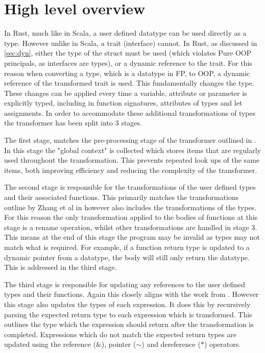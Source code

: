 \documentclass[ oneside,%
                    author={James Elgar},
                    degree={MEng},
                     title={Bidirectional transformer between functional and \\ object-oriented programming in Rust},
                  subtitle={}]{dissertation}
\newcommand{\weixin}{Zhang et al }
\begin{document}
\section{High level overview}

In Rust, much like in Scala, a user defined datatype can be used directly as a type. However unlike in Scala, a trait (interface) cannot. In Rust, as discussed in \autoref{sec:dyn}, either the type of the struct must be used (which violates Pure OOP principals, as interfaces are types), or a dynamic reference to the trait. For this reason when converting a type, which is a datatype in FP, to OOP, a dynamic reference of the transformed trait is used. This fundamentally changes the type. These changes can be applied every time a variable, attribute or parameter is explicitly typed, including in function signatures, attributes of types and let assignments.
In order to accommodate these additional transformations of types the transformer has been split into 3 stages. 

The first stage, matches the pre-processing stage of the transformer outlined in \cite{food}. In this stage the "global context" is collected which stores items that are regularly used throughout the transformation. This prevents repeated look ups of the same items, both improving efficiency and reducing the complexity of the transformer.


The second stage is responsible for the transformations of the user defined types and their associated functions. This primarily matches the transformations outline by \weixin in \cite{food} however also includes the transformations of the types. For this reason the only transformation applied to the bodies of functions at this stage is a rename operation, whilst other transformations are handled in stage 3. This means at the end of this stage the program may be invalid as types may not match what is required. For example, if a function return type is updated to a dynamic pointer from a datatype, the body will still only return the datatype. This is addressed in the third stage.

The third stage is responsible for updating any references to the user defined types and their functions. Again this closely aligns with the work from \cite{food}. However this stage also updates the types of each expression. It does this by recursively parsing the expected return type to each expression which is transformed. This outlines the type which the expression should return after the transformation is completed. Expressions which do not match the expected return types are updated using the reference ($\&$), pointer ($\sim$) and dereference ($*$) operators. 
\end{document}
